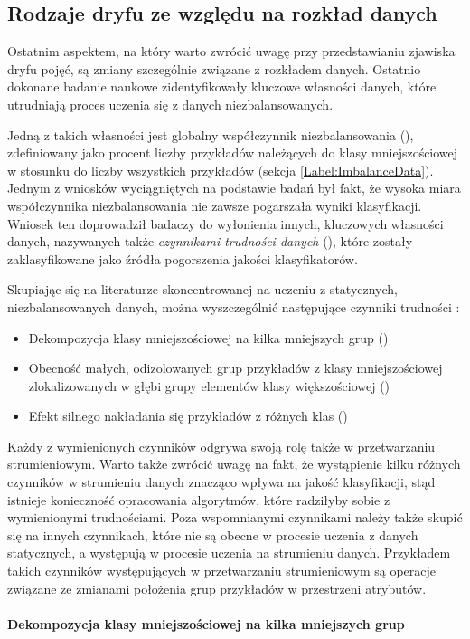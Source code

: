 \subsection{Rodzaje dryfu ze względu na rozkład danych}
\label{Section:DriftDataDistribution}

\noindent Ostatnim aspektem, na który warto zwrócić uwagę przy przedstawianiu zjawiska dryfu pojęć, są zmiany szczególnie związane z rozkładem danych. Ostatnio dokonane badanie naukowe zidentyfikowały kluczowe własności danych, które utrudniają proces uczenia się z danych niezbalansowanych.

Jedną z takich własności jest globalny współczynnik niezbalansowania (), zdefiniowany jako procent liczby przykładów należących do klasy mniejszościowej w stosunku do liczby wszystkich przykładów (sekcja \ref{Label:ImbalanceData}). Jednym z wniosków wyciągniętych na podstawie badań był fakt, że wysoka miara współczynnika niezbalansowania nie zawsze pogarszała wyniki klasyfikacji. Wniosek ten doprowadził badaczy do wyłonienia innych, kluczowych własności danych, nazywanych także \textit{czynnikami trudności danych} (), które zostały zaklasyfikowane jako źródła pogorszenia jakości klasyfikatorów.

Skupiając się na literaturze skoncentrowanej na uczeniu z statycznych, niezbalansowanych danych, można wyszczególnić następujące czynniki trudności \cite{Book:DataDistribution}\cite{Article:DataDistribution}:

\begin{itemize}
    \item Dekompozycja klasy mniejszościowej na kilka mniejszych grup ()
    \item Obecność małych, odizolowanych grup przykładów z klasy mniejszościowej zlokalizowanych w głębi grupy elementów klasy większościowej ()
    \item Efekt silnego nakładania się przykładów z różnych klas ()
\end{itemize}

\noindent Każdy z wymienionych czynników odgrywa swoją rolę także w przetwarzaniu strumieniowym. Warto także zwrócić uwagę na fakt, że wystąpienie kilku różnych czynników w strumieniu danych znacząco wpływa na jakość klasyfikacji, stąd istnieje konieczność opracowania algorytmów, które radziłyby sobie z wymienionymi trudnościami. Poza wspomnianymi czynnikami należy także skupić się na innych czynnikach, które nie są obecne w procesie uczenia z danych statycznych, a występują w procesie uczenia na strumieniu danych. Przykładem takich czynników występujących w przetwarzaniu strumieniowym są operacje związane ze zmianami położenia grup przykładów w przestrzeni atrybutów.\\\\
\textbf{Dekompozycja klasy mniejszościowej na kilka mniejszych grup}\\

